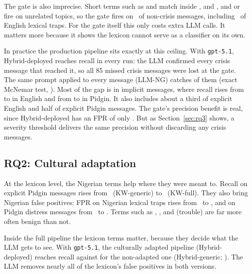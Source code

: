 The gate is also imprecise. Short terms such as  and  match inside ,  and , and  or  fire on unrelated topics, so the gate fires on \KWfullFPR\ of non-crisis messages, including \KWfullNfour\ of English lexical traps. For the gate itself this only costs extra LLM calls. It matters more because it shows the lexicon cannot serve as a classifier on its own.

In practice the production pipeline sits exactly at this ceiling. With \texttt{gpt-5.1}, Hybrid-deployed reaches  recall in every run: the LLM confirmed every crisis message that reached it, so all 85 missed crisis messages were lost at the gate. The same prompt applied to every message (LLM-NG) catches  of them (exact McNemar test, ). Most of the gap is in implicit messages, where recall rises from  to  in English and from  to  in Pidgin. It also includes about a third of explicit English and half of explicit Pidgin messages. The gate's precision benefit is real, since Hybrid-deployed has an FPR of only . But as Section~\ref{sec:rq3} shows, a severity threshold delivers the same precision without discarding any crisis messages.

\subsection{RQ2: Cultural adaptation}
At the lexicon level, the Nigerian terms help where they were meant to. Recall on explicit Pidgin messages rises from \KWgenCthree\ (KW-generic) to \KWfullCthree\ (KW-full). They also bring Nigerian false positives: FPR on Nigerian lexical traps rises from \KWgenNfive\ to \KWfullNfive, and on Pidgin distress messages from \KWgenNthree\ to \KWfullNthree. Terms such as , ,  and  (trouble) are far more often benign than not.

Inside the full pipeline the lexicon terms matter, because they decide what the LLM gets to see. With \texttt{gpt-5.1}, the culturally adapted pipeline (Hybrid-deployed) reaches  recall against  for the non-adapted one (Hybrid-generic; ). The LLM removes nearly all of the lexicon's false positives in both versions.

